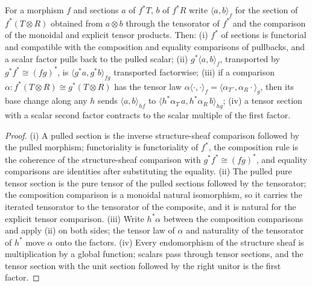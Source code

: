 \begin{lemma}
\label{lem:twisted-ratio-section-calculus}
\leanok
For a morphism $f$ and sections $a$ of $f^*T$, $b$ of $f^*R$ write
$\langle a,b\rangle_f$ for the section of $f^*(T\otimes R)$ obtained from
$a\otimes b$ through the tensorator of $f^*$ and the comparison of the
monoidal and explicit tensor products.  Then:
(i) $f^*$ of sections is functorial and compatible with the composition and
equality comparisons of pullbacks, and a scalar factor pulls back to the
pulled scalar;
(ii) $g^*\langle a,b\rangle_f$, transported by $g^*f^*\cong(fg)^*$, is
$\langle g^*a,g^*b\rangle_{fg}$ transported factorwise;
(iii) if a comparison $\alpha:f^*(T\otimes R)\cong g^*(T\otimes R)$ has the
tensor law $\alpha\langle\cdot,\cdot\rangle_f=\langle\alpha_T\cdot,\alpha_R\cdot\rangle_g$,
then its base change along any $h$ sends $\langle a,b\rangle_{hf}$ to
$\langle h^*\alpha_T\, a,h^*\alpha_R\, b\rangle_{hg}$;
(iv) a tensor section with a scalar second factor contracts to the scalar
multiple of the first factor.
\end{lemma}
\begin{proof}
(i) A pulled section is the inverse structure-sheaf comparison followed by
the pulled morphism; functoriality is functoriality of $f^*$, the
composition rule is the coherence of the structure-sheaf comparison with
$g^*f^*\cong(fg)^*$, and equality comparisons are identities after
substituting the equality.  (ii) The pulled pure tensor section is the pure
tensor of the pulled sections followed by the tensorator; the composition
comparison is a monoidal natural isomorphism, so it carries the iterated
tensorator to the tensorator of the composite, and it is natural for the
explicit tensor comparison.  (iii) Write $h^*\alpha$ between the composition
comparisons and apply (ii) on both sides; the tensor law of $\alpha$ and
naturality of the tensorator of $h^*$ move $\alpha$ onto the factors.
(iv) Every endomorphism of the structure sheaf is multiplication by a global
function; scalars pass through tensor sections, and the tensor section with
the unit section followed by the right unitor is the first factor.
\end{proof}


